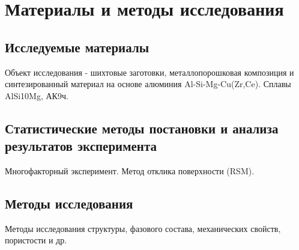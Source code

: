 \chapter{Материалы и методы исследования}\label{ch:chapter3}

\section{Исследуемые материалы}\label{sec:chapter3/section1}

Объект исследования - шихтовые заготовки, металлопорошковая композиция и синтезированный материал на основе алюминия Al-Si-Mg-Cu(Zr,Ce). Сплавы AlSi10Mg, АК9ч.

\section{Статистические методы постановки и анализа результатов эксперимента}\label{sec:chapter3/section2}

Многофакторный эксперимент. Метод отклика поверхности (RSM). 

\section{Методы исследования}\label{sec:chapter3/section3}

Методы исследования структуры, фазового состава, механических свойств, пористости и др.